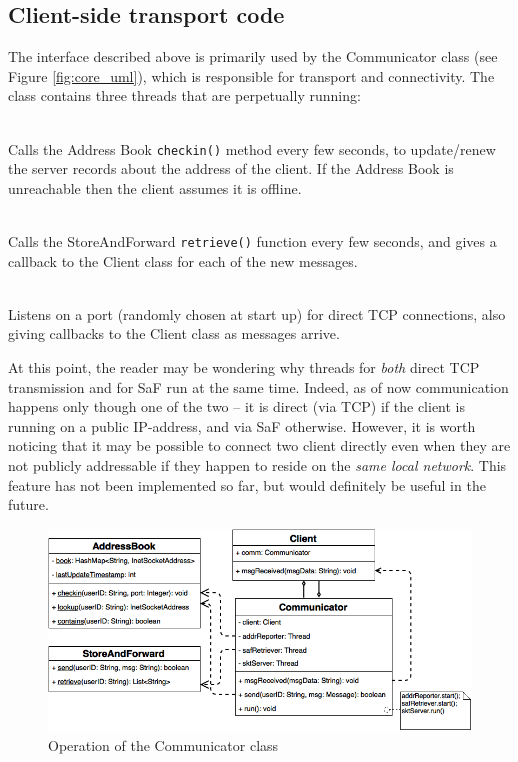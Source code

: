 \documentclass[a4paper, 12pt]{report}
\begin{document}

\subsection{Client-side transport code}
The interface described above is primarily used by the Communicator class (see Figure \ref{fig:core_uml}), which is responsible for transport and connectivity. The class contains three threads that are perpetually running:
\begin{description}[labelindent=0.5cm, leftmargin=1.3cm, rightmargin=0.5cm]
    \item[Address-reporting thread] \hfill \\
        Calls the Address Book \texttt{checkin()} method every few seconds, to update/renew the server records about the address of the client. If the Address Book is unreachable then the client assumes it is offline.
    \item[SaF Querying Thread] \hfill \\
        Calls the StoreAndForward \texttt{retrieve()} function every few seconds, and gives a callback to the Client class for each of the new messages.
    \item[TCP Socket Server Thread] \hfill \\
        Listens on a port (randomly chosen at start up) for direct TCP connections, also giving callbacks to the Client class as messages arrive.
\end{description}
At this point, the reader may be wondering why threads for \emph{both} direct TCP transmission and for SaF run at the same time. Indeed, as of now communication happens only though one of the two -- it is direct (via TCP) if the client is running on a public IP-address, and via SaF otherwise. However, it is worth noticing that it may be possible to connect two client directly even when they are not publicly addressable if they happen to reside on the \emph{same local network}. This feature has not been implemented so far, but would definitely be useful in the future. \\

\begin{figure}[H]
\centering
\includegraphics[width = 0.8 \linewidth]{pics/communicator_uml.png}
\caption{\label{fig:communicator_uml} Operation of the Communicator class}
\end{figure}
\end{document}

